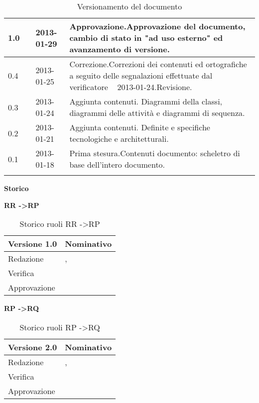 \begin{longtable}{p{} p{} p{} p{}}
\midrule
1.0	&	\VP &	2013-01-29	&	Approvazione.\newline Approvazione del documento, cambio di stato in "\stato ad uso esterno" ed avanzamento di versione.\\
\midrule
0.4	&	\DC &	2013-01-25	&	Correzione.\newline Correzioni dei contenuti ed ortografiche a seguito delle segnalazioni effettuate dal verificatore \EZ~ 2013-01-24.\newline Revisione.\\
\midrule
0.3	&	\MB &	2013-01-24	&	Aggiunta contenuti. \newline Diagrammi della classi, diagrammi delle attività e diagrammi di sequenza.\\
\midrule
0.2	&	\DC &	2013-01-21	&	Aggiunta contenuti. \newline Definite e specifiche tecnologiche e architetturali.\\
\midrule
0.1	&	\DC &	2013-01-18	&	Prima stesura.\newline Contenuti documento: scheletro di base dell'intero documento.\\
\bottomrule
\caption{Versionamento del documento}
	\end{longtable}

\newpage

\Large{\textbf{Storico }}\\
\normalsize

\textbf{RR -\textgreater RP}

\begin{table}[h]
\begin{center}

\begin{tabular}{p{} p{}}
\toprule
\textbf{Versione 1.0}	&	\textbf{Nominativo}\\
\midrule
\midrule
Redazione	&	\MB , \DC \\
\midrule
Verifica &	\EZ	\\
\midrule
Approvazione	&	\VP	\\
\bottomrule
\end{tabular}
\caption{Storico ruoli RR -\textgreater RP}
\label{tabVers1}
\end{center}
\end{table}

\textbf{RP -\textgreater RQ}

\begin{table}[h]
\begin{center}

\begin{tabular}{p{} p{}}
\toprule
\textbf{Versione 2.0}	&	\textbf{Nominativo}\\
\midrule
\midrule
Redazione	&	\EZ , \FZ \\
\midrule
Verifica &	\DC	\\
\midrule
Approvazione	&	\VP	\\
\bottomrule
\end{tabular}
\caption{Storico ruoli RP -\textgreater RQ}
\label{tabVers2}
\end{center}
\end{table}

